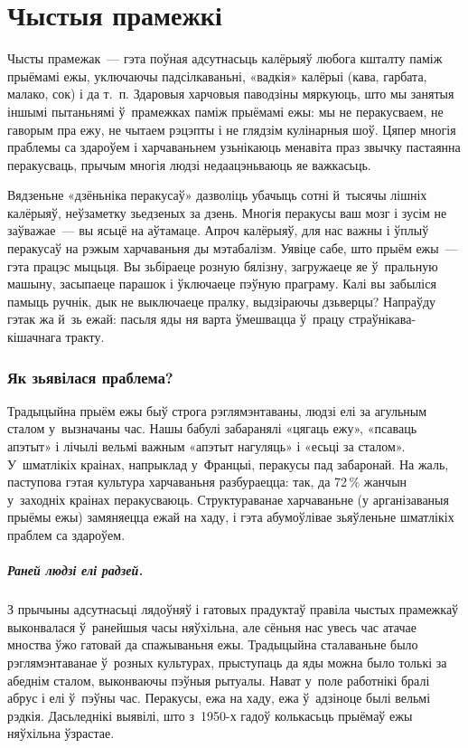 \chapter{Чыстыя прамежкі}

Чысты прамежак~--- гэта поўная адсутнасьць калёрыяў любога кшталту паміж прыёмамі ежы, уключаючы падсілкаваньні, «вадкія» калёрыі (кава, гарбата, малако, сок) і да т.~п. Здаровыя харчовыя паводзіны мяркуюць, што мы занятыя іншымі пытаньнямі ў~прамежках паміж прыёмамі ежы: мы не перакусваем, не гаворым пра ежу, не чытаем рэцэпты і не глядзім кулінарныя шоў. Цяпер многія праблемы са здароўем і харчаваньнем узьнікаюць менавіта праз звычку пастаянна перакусваць, прычым многія людзі недаацэньваюць яе важкасьць.

Вядзеньне «дзёньніка перакусаў» дазволіць убачыць сотні й~тысячы лішніх калёрыяў, неўзаметку зьедзеных за дзень. Многія перакусы ваш мозг і зусім не заўважае~--- вы ясьцё на аўтамаце. Апроч калёрыяў, для нас важны і ўплыў перакусаў на рэжым харчаваньня ды мэтабалізм. Уявіце сабе, што прыём ежы~--- гэта працэс мыцьця. Вы зьбіраеце розную бялізну, загружаеце яе ў~пральную машыну, засыпаеце парашок і ўключаеце пэўную праграму. Калі вы забыліся памыць ручнік, дык не выключаеце пралку, выдзіраючы дзьверцы? Напраўду гэтак жа й~зь ежай: пасьля яды ня варта ўмешвацца ў~працу страўнікава-кішачнага тракту.

\subsection{Як зьявілася праблема?}

Традыцыйна прыём ежы быў строга рэглямэнтаваны, людзі елі за агульным сталом у~вызначаны час. Нашы бабулі забаранялі «цягаць ежу», «псаваць апэтыт» і лічылі вельмі важным «апэтыт нагуляць» і «есьці за сталом». У~шматлікіх краінах, напрыклад у~Францыі, перакусы пад забаронай. На жаль, паступова гэтая культура харчаваньня разбураецца: так, да 72\,\% жанчын у~заходніх краінах перакусваюць. Структураванае харчаваньне (у арганізаваныя прыёмы ежы) замяняецца ежай на хаду, і гэта абумоўлівае зьяўленьне шматлікіх праблем са здароўем.

\paragraph{Раней людзі елі радзей.}
З прычыны адсутнасьці лядоўняў і гатовых прадуктаў правіла чыстых прамежкаў выконвалася ў~ранейшыя часы няўхільна, але сёньня нас увесь час атачае мноства ўжо гатовай да спажываньня ежы. Традыцыйна сталаваньне было рэглямэнтаванае ў~розных культурах, прыступаць да яды можна было толькі за абеднім сталом, выконваючы пэўныя рытуалы. Нават у~поле работнікі бралі абрус і елі ў~пэўны час. Перакусы, ежа на хаду, ежа ў~адзіноце былі вельмі рэдкія. Дасьледнікі выявілі, што з~1950-х гадоў колькасьць прыёмаў ежы няўхільна ўзрастае.

